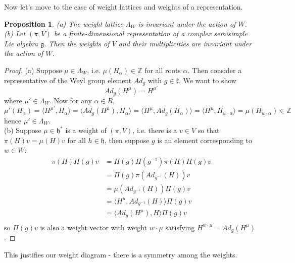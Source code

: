 \documentclass[11pt]{article}
\newtheorem{proposition}[theorem]{Proposition}
\newcommand{\bb}[1]{\mathbb{#1}}
\newcommand{\mf}[1]{\mathfrak{#1}}
\begin{document}
Now let's move to the case of weight lattices and weights of a representation.
\begin{proposition} \label{wtweyl}
(a) The weight lattice $\Lambda_W$ is invariant under the action of $W$.\\
(b) Let $(\pi,V)$ be a finite-dimensional representation of a complex semisimple Lie algebra $\mf{g}$. Then the weights of $V$ and their multiplicities are invariant under the action of $W$.\\
\end{proposition}
\begin{proof}
(a) Suppose $\mu \in \Lambda_W$, i.e. $\mu(H_{\alpha}) \in \bb{Z}$ for all roots $\alpha$. Then consider a representative of the Weyl group element $Ad_g$ with $g \in \mf{k}$. We want to show
$$Ad_g (H^{\mu}) = H^{\mu'}$$
where $\mu' \in \Lambda_W$. Now for any $\alpha \in R$,
$$\mu'(H_{\alpha}) = \langle H^{\mu'}, H_{\alpha} \rangle = \langle Ad_g (H^{\mu}), H_{\alpha} \rangle = \langle H^{\mu},  Ad_g(H_{\alpha}) \rangle = \langle H^{\mu}, H_{w\cdot \alpha} \rangle = \mu(H_{w \cdot \alpha}) \in \bb{Z}$$
hence $\mu' \in \Lambda_W$.\\
(b) Suppose $\mu \in \mf{h}^*$ is a weight of $(\pi,V)$, i.e. there is a $v \in V$ so that $\pi(H)v = \mu(H)v$ for all $h \in \mf{h}$, then suppose $g$ is an element corresponding to $w \in W$:
\begin{align*}
\pi(H) \Pi(g)v &= \Pi(g) \Pi(g^{-1})\pi(H)\Pi(g)v\\
&= \Pi(g) \pi(Ad_{g^{-1}}(H))v\\
&= \mu(Ad_{g^{-1}}(H)) \Pi(g)v\\
&= \langle H^{\mu}, Ad_{g^{-1}}(H) \rangle \Pi(g)v\\
&= \langle Ad_{g}(H^{\mu}), H \rangle \Pi(g)v\\
\end{align*}
so $\Pi(g)v$ is also a weight vector with weight $w\cdot \mu$ satisfying $H^{w \cdot \mu} = Ad_g(H^{\mu})$.
\end{proof}
This justifies our weight diagram - there is a symmetry among the weights.\\
\end{document}
